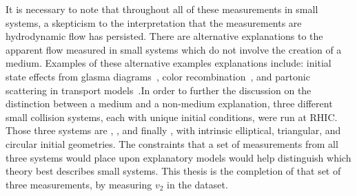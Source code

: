 It is necessary to note that throughout all of these measurements in small systems, a skepticism to the interpretation that the measurements are hydrodynamic flow has persisted. There are alternative explanations to the apparent flow measured in small systems which do not involve the creation of a medium. Examples of these alternative examples explanations include: initial state effects from glasma diagrams~\cite{PhysRevLett.108.262001}, color recombination~\cite{PhysRevLett.111.042001}, and partonic scattering in transport models~\cite{PhysRevLett.113.252301}.In order to further the discussion on the distinction between a medium and a non-medium explanation, three different small collision systems, each with unique initial conditions, were run at RHIC. Those three systems are \dau, \hau, and finally \pau, with intrinsic elliptical, triangular, and circular initial geometries. The constraints that a set of measurements from all three systems would place upon explanatory models would help distinguish which theory best describes small systems. This thesis is the completion of that set of three measurements, by measuring $v_2$ in the \pau dataset.



